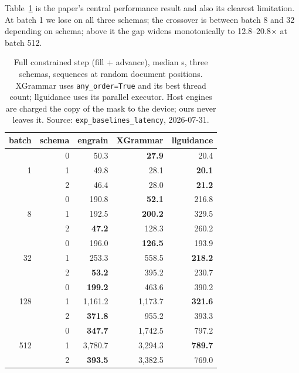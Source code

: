 \documentclass{article}
\begin{document}
Table~\ref{tab:step} is the paper's central performance result and also its
clearest limitation. At batch 1 we lose on all three schemas; the crossover is
between batch 8 and 32 depending on schema; above it the gap widens
monotonically to 12.8--20.8$\times$ at batch 512.

\begin{table}[t]
\caption{Full constrained step (fill + advance), median \textmu{}s, three
schemas, sequences at random document positions. XGrammar uses
\texttt{any\_order=True} and its best thread count; llguidance uses its
parallel executor. Host engines are charged the copy of the mask to the device;
ours never leaves it. Source: \texttt{exp\_baselines\_latency}, 2026-07-31.}
\label{tab:step}
\vskip 0.1in
\begin{center}
\begin{small}
\begin{tabular}{rrrrr}
\toprule
batch & schema & engrain & XGrammar & llguidance \\
\midrule
\multirow{3}{*}{1}
 & 0 & 50.3 & \textbf{27.9} & 20.4 \\
 & 1 & 49.8 & 28.1 & \textbf{20.1} \\
 & 2 & 46.4 & 28.0 & \textbf{21.2} \\
\midrule
\multirow{3}{*}{8}
 & 0 & 190.8 & \textbf{52.1} & 216.8 \\
 & 1 & 192.5 & \textbf{200.2} & 329.5 \\
 & 2 & \textbf{47.2} & 128.3 & 260.2 \\
\midrule
\multirow{3}{*}{32}
 & 0 & 196.0 & \textbf{126.5} & 193.9 \\
 & 1 & 253.3 & 558.5 & \textbf{218.2} \\
 & 2 & \textbf{53.2} & 395.2 & 230.7 \\
\midrule
\multirow{3}{*}{128}
 & 0 & \textbf{199.2} & 463.6 & 390.2 \\
 & 1 & 1{,}161.2 & 1{,}173.7 & \textbf{321.6} \\
 & 2 & \textbf{371.8} & 955.2 & 393.3 \\
\midrule
\multirow{3}{*}{512}
 & 0 & \textbf{347.7} & 1{,}742.5 & 797.2 \\
 & 1 & 3{,}780.7 & 3{,}294.3 & \textbf{789.7} \\
 & 2 & \textbf{393.5} & 3{,}382.5 & 769.0 \\
\bottomrule
\end{tabular}
\end{small}
\end{center}
\vskip -0.1in
\end{table}
\end{document}
